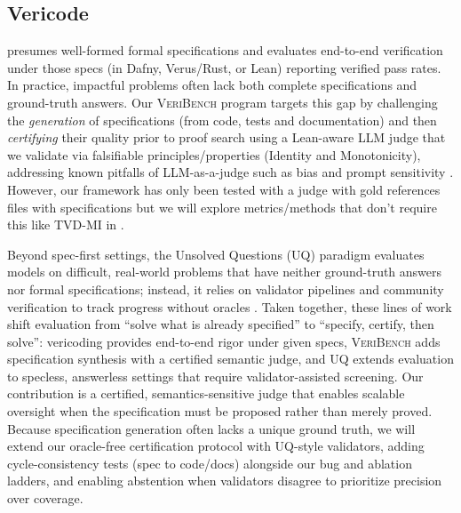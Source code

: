 \documentclass{article}
\begin{document}
\subsection{Vericode}
\citet{bursuc2025benchmarkvericodingformallyverified} presumes well-formed formal specifications and evaluates end-to-end verification under those specs (in Dafny, Verus/Rust, or Lean) reporting verified pass rates.
In practice, impactful problems often lack both complete specifications and ground-truth answers.
Our \textsc{VeriBench} program targets this gap by challenging the \emph{generation} of specifications (from code, tests and documentation) and then \emph{certifying} their quality prior to proof search using a Lean-aware LLM judge that we validate via falsifiable principles/properties (Identity and Monotonicity), addressing known pitfalls of LLM-as-a-judge such as bias and prompt sensitivity \citep{Zheng2023MTBench,Kocmi2024HumanVsLLM,Li2024TrustLLMJudgments}.
However, our framework has only been tested with a judge with gold references files with specifications but we will explore metrics/methods that don't require this like TVD-MI in \citep{robertson2025stepbystep}.

Beyond spec-first settings, the Unsolved Questions (UQ) paradigm evaluates models on difficult, real-world problems that have neither ground-truth answers nor formal specifications; instead, it relies on validator pipelines and community verification to track progress without oracles \cite{nie2025uqassessinglanguagemodels,uq2025}.
Taken together, these lines of work shift evaluation from ``solve what is already specified'' to ``specify, certify, then solve'':
vericoding provides end-to-end rigor under given specs, \textsc{VeriBench} adds specification synthesis with a certified semantic judge, and UQ extends evaluation to specless, answerless settings that require validator-assisted screening.
Our contribution is a certified, semantics-sensitive judge that enables scalable oversight when the specification must be proposed rather than merely proved.
Because specification generation often lacks a unique ground truth, we will extend our oracle-free certification protocol with UQ-style validators, adding cycle-consistency tests (spec to code/docs) alongside our bug and ablation ladders, and enabling abstention when validators disagree to prioritize precision over coverage.
\end{document}
